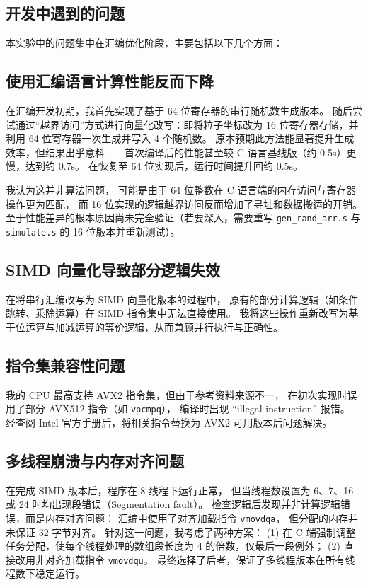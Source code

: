 \documentclass[a4paper,12pt]{article}
\begin{document}
\begin{CJK}{UTF8}{gbsn}
	\section{开发中遇到的问题}
	本实验中的问题集中在汇编优化阶段，主要包括以下几个方面：

	\subsection{使用汇编语言计算性能反而下降}
	在汇编开发初期，我首先实现了基于 64 位寄存器的串行随机数生成版本。
	随后尝试通过“越界访问”方式进行向量化改写：即将粒子坐标改为 16 位寄存器存储，并利用 64 位寄存器一次生成并写入 4 个随机数。
	原本预期此方法能显著提升生成效率，但结果出乎意料——首次编译后的性能甚至较 C 语言基线版（约 0.5s）更慢，达到约 0.7s。
	在恢复至 64 位实现后，运行时间提升回约 0.5s。

	我认为这并非算法问题，
	可能是由于 64 位整数在 C 语言端的内存访问与寄存器操作更为匹配，
	而 16 位实现的逻辑越界访问反而增加了寻址和数据搬运的开销。
	至于性能差异的根本原因尚未完全验证（若要深入，需要重写 \texttt{gen\_rand\_arr.s} 与 \texttt{simulate.s} 的 16 位版本并重新测试）。

	\subsection{SIMD 向量化导致部分逻辑失效}
	在将串行汇编改写为 SIMD 向量化版本的过程中，
	原有的部分计算逻辑（如条件跳转、乘除运算）在 SIMD 指令集中无法直接使用。
	我将这些操作重新改写为基于位运算与加减运算的等价逻辑，从而兼顾并行执行与正确性。

	\subsection{指令集兼容性问题}
	我的 CPU 最高支持 AVX2 指令集，但由于参考资料来源不一，
	在初次实现时误用了部分 AVX512 指令（如 \texttt{vpcmpq}），
	编译时出现 “illegal instruction” 报错。
	经查阅 Intel 官方手册后，将相关指令替换为 AVX2 可用版本后问题解决。

	\subsection{多线程崩溃与内存对齐问题}
	在完成 SIMD 版本后，程序在 8 线程下运行正常，
	但当线程数设置为 6、7、16 或 24 时均出现段错误（Segmentation fault）。
	检查逻辑后发现并非计算逻辑错误，而是内存对齐问题：
	汇编中使用了对齐加载指令 \texttt{vmovdqa}，
	但分配的内存并未保证 32 字节对齐。
	针对这一问题，我考虑了两种方案：
	(1) 在 C 端强制调整任务分配，使每个线程处理的数组段长度为 4 的倍数，仅最后一段例外；
	(2) 直接改用非对齐加载指令 \texttt{vmovdqu}。
	最终选择了后者，保证了多线程版本在所有线程数下稳定运行。


\end{CJK}
\end{document}
